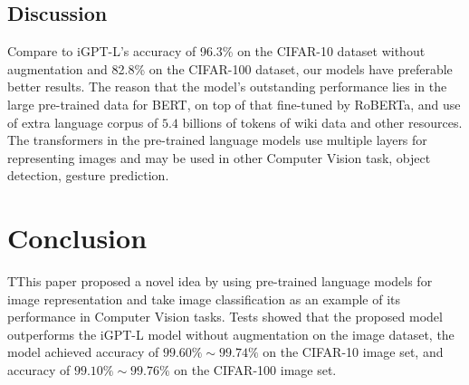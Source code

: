 \documentclass[review]{cvpr}
\begin{document}
\subsection{Discussion}

 Compare to iGPT-L's accuracy of 96.3\% on the CIFAR-10 dataset without augmentation and 82.8\% on the CIFAR-100 dataset, our models have preferable better results.
The reason that the model's outstanding performance lies in the large pre-trained data for BERT, on top of that fine-tuned by RoBERTa, and use of extra language corpus of
$5.4$ billions of tokens of wiki data and other resources.
The transformers in the pre-trained language models use multiple layers for representing images and may be used in other Computer Vision task, \eg object detection, gesture prediction.


\section{Conclusion}

TThis paper proposed a novel idea by using pre-trained language models for image representation and take image classification as an example of its performance in Computer Vision tasks.
Tests showed that the proposed model outperforms the iGPT-L model without augmentation on the image dataset,
the model achieved accuracy of $99.60\%\sim99.74\%$ on the CIFAR-10 image set,
and accuracy of $99.10\%\sim99.76\%$ on the CIFAR-100 image set.


{\small


}
\end{document}
